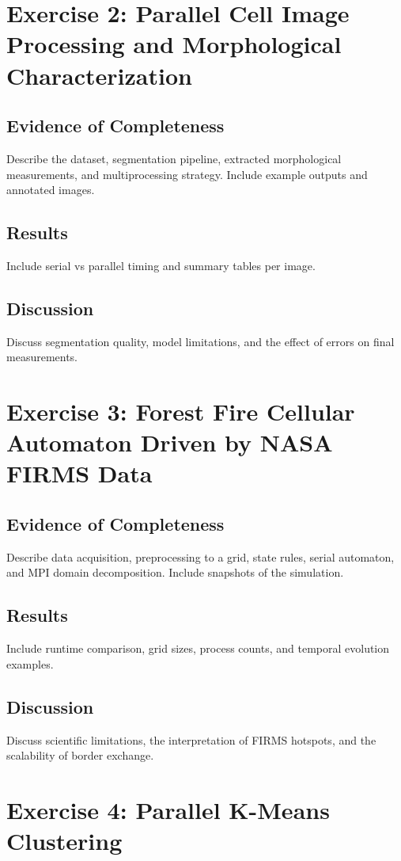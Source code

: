 \documentclass[conference]{IEEEtran}
\begin{document}
\section{Exercise 2: Parallel Cell Image Processing and Morphological Characterization}
\subsection{Evidence of Completeness}
Describe the dataset, segmentation pipeline, extracted morphological measurements, and multiprocessing strategy. Include example outputs and annotated images.

\subsection{Results}
Include serial vs parallel timing and summary tables per image.

\subsection{Discussion}
Discuss segmentation quality, model limitations, and the effect of errors on final measurements.

\section{Exercise 3: Forest Fire Cellular Automaton Driven by NASA FIRMS Data}
\subsection{Evidence of Completeness}
Describe data acquisition, preprocessing to a grid, state rules, serial automaton, and MPI domain decomposition. Include snapshots of the simulation.

\subsection{Results}
Include runtime comparison, grid sizes, process counts, and temporal evolution examples.

\subsection{Discussion}
Discuss scientific limitations, the interpretation of FIRMS hotspots, and the scalability of border exchange.

\section{Exercise 4: Parallel K-Means Clustering}
\end{document}
